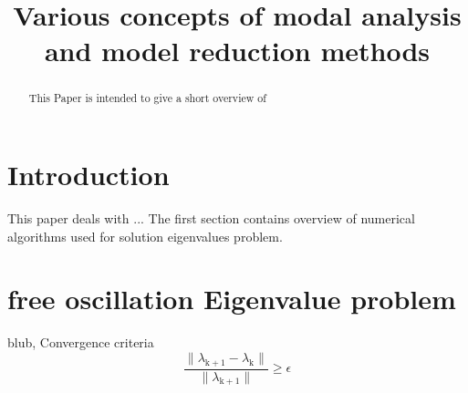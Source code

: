\documentclass[conference]{journal}%
\begin{document}
	
	\title{Various concepts of modal analysis and model reduction methods}
	
	\author{
		}
	
	\maketitle
	
	\begin{abstract}
		This Paper is intended to give a short overview of 
	\end{abstract}
	
	
	
	
	
	\IEEEpeerreviewmaketitle
	
	\section{Introduction}
	
	This paper deals with ...
	The first section contains overview of numerical algorithms used for solution eigenvalues problem.
	
	\section{free oscillation Eigenvalue problem}
	blub, Convergence criteria
	\begin{equation}
	\frac{\lVert \lambda_{\mathrm{k+1}}-\lambda_{\mathrm{k}} \rVert}{\lVert \lambda_{\mathrm{k+1}}\rVert}\geq \epsilon
	\end{equation}
\end{document}
